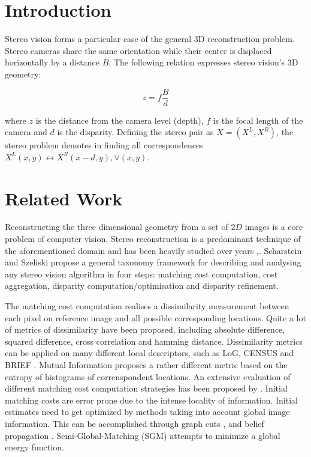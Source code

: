 \documentclass[runningheads]{llncs}
\begin{document}
\section{Introduction}

Stereo vision forms a particular case of the general 3D reconstruction problem. Stereo cameras share the same orientation while their center is displaced horizontally by a distance $B$. The following relation expresses stereo vision's 3D geometry:

\begin{equation} \label{eq:stereo_geometry}
z = f\frac{B}{d}
\end{equation}

where $z$ is the distance from the camera level (depth), $f$ is the focal length of the camera and $d$ is the disparity. Defining the stereo pair as $X = (X^L, X^R)$, the stereo problem demotes in finding all correspondences $X^L(x,y) \leftrightarrow X^R(x-d, y), \forall (x,y)$.

\section{Related Work}

Reconstructing the three dimensional geometry from a set of $2D$ images is a core problem of computer vision. Stereo reconstruction is a predominant technique of the aforementioned domain and has been heavily studied over years \cite{Barnard1982ComputationalStereo},\cite{Brown2003}. Scharstein and Szeliski \cite{Scharstein2001AAlgorithms} propose a general taxonomy framework for describing and analysing any stereo vision algorithm in four steps: matching cost computation, cost aggregation, disparity computation/optimisation and disparity refinement.

The matching cost computation realises a dissimilarity measurement between each pixel on reference image and all possible corresponding locations. Quite a lot of metrics of dissimilarity have been proposed, including  absolute difference, squared difference, cross correlation and hamming distance. Dissimilarity metrics can be applied on many different local descriptors, such as LoG, CENSUS \cite{Zabih1996ACorrespondence} and BRIEF \cite{Calonder2010}. Mutual Information \cite{Viola1997} proposes a rather different metric based on the entropy of histograms of correnspondent locations. An extensive evaluation of different matching cost computation strategies has been proposed by \cite{Hirschmuller2007}. Initial matching costs are error prone due to the intense locality of information. Initial estimates need to get optimized by methods taking into account global image information. This can be accomplished through graph cuts \cite{Kolmogorov}, \cite{Boykov2001} and belief propagation \cite{Klaus2006}. Semi-Global-Matching (SGM) \cite{Hirschmuller2008StereoInformation} attempts to minimize a global energy function.
\end{document}
